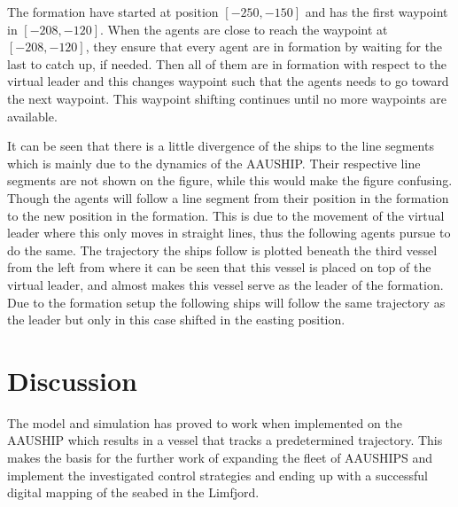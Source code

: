 \documentclass[a4paper,conference]{IEEEtran}
\begin{document}
The formation have started at position $[-250,-150]$ and has the first waypoint in $[-208,-120]$. When the agents are close to reach the waypoint at $[-208,-120]$, they ensure that every agent are in formation by waiting for the last to catch up, if needed. Then all of them are in formation with respect to the virtual leader and this changes waypoint such that the agents needs to go toward the next waypoint. This waypoint shifting continues until no more waypoints are available.

It can be seen that there is a little divergence of the ships to the line segments which is mainly due to the dynamics of the AAUSHIP. Their respective line segments are not shown on the figure, while this would make the figure confusing. Though the agents will follow a line segment from their position in the formation to the new position in the formation. This is due to the movement of the virtual leader where this only moves in straight lines, thus the following agents pursue to do the same. The trajectory the ships follow is plotted beneath the third vessel from the left from where it can be seen that this vessel is placed on top of the virtual leader, and almost makes this vessel serve as the leader of the formation. Due to the formation setup the following ships will follow the same trajectory as the leader but only in this case shifted in the easting position.

\vspace{-2mm}
\section{Discussion}

The model and simulation has proved to work when implemented on the AAUSHIP which results in a vessel that tracks a predetermined trajectory. This makes the basis for the further work of expanding the fleet of AAUSHIPS and implement the investigated control strategies and ending up with a successful digital mapping of the seabed in the Limfjord.


\vspace{-2mm}
 

\end{document}
